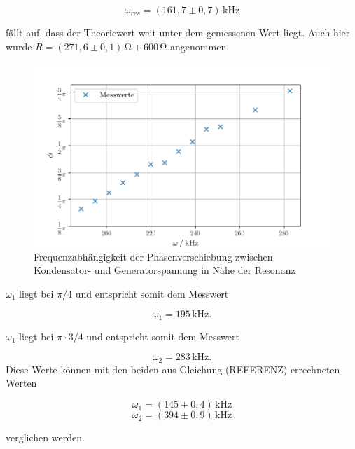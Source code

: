 \begin{equation*}
  \omega_{res}=(161,7\pm0,7)\,\si{\kilo\hertz}
\end{equation*}

\noindent fällt auf, dass der Theoriewert weit unter dem gemessenen Wert liegt.
Auch hier wurde $R=(271,6\pm0,1)\,\si{\ohm} + 600\,\si{\ohm}$ angenommen.
\begin{figure}[H]
  \centering
  \includegraphics{build/plot5.pdf}
  \caption{Frequenzabhängigkeit der Phasenverschiebung zwischen Kondensator- und Generatorspannung in Nähe der Resonanz}
  \label{fig:i}
\end{figure}
\noindent $\omega_1$ liegt bei $\pi/4$ und entspricht
somit dem Messwert

\begin{equation*}
  \omega_1=195\,\si{\kilo\hertz}.
\end{equation*}


\noindent $\omega_1$ liegt bei $\pi \cdot 3/4$ und entspricht
somit dem Messwert

\begin{equation*}
\omega_2=283\,\si{\kilo\hertz}.
\end{equation*}
\noindent Diese Werte können mit den beiden aus Gleichung (REFERENZ)
errechneten Werten 

\begin{equation*}
  \omega_1=(145\pm0,4)\,\si{\kilo\hertz}
\end{equation*}
\begin{equation*}
  \omega_2=(394\pm0,9)\,\si{\kilo\hertz}
\end{equation*}

\noindent verglichen werden.


